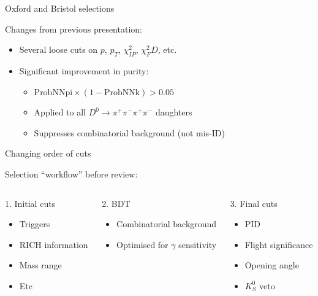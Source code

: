 \documentclass[xcolor={dvipsnames}]{beamer}
\begin{document}
\begin{frame}{Oxford and Bristol selections}
  \begin{center}
    {\Large Changes from previous presentation:}
  \end{center}
  \vspace{0.5cm}
  \begin{itemize}
    \setlength\itemsep{1.8em}
    \item{Several loose cuts on $p$, $p_T$, $\chi^2_{IP}$, $\chi^2_FD$, etc.}
    \item{Significant improvement in purity:}
    \begin{itemize}
      \item{$\text{ProbNNpi}\times(1 - \text{ProbNNk}) > 0.05$}
      \item{Applied to all $D^0\to\pi^+\pi^-\pi^+\pi^-$ daughters}
      \item{Suppresses combinatorial background (not mis-ID)}
    \end{itemize}
  \end{itemize}
\end{frame}

\begin{frame}{Changing order of cuts}
  \begin{center}
    {\Large Selection ``workflow'' before review:}
  \end{center}
  \vspace{0.4cm}
  \begin{columns}
    \begin{column}{0.33\textwidth}
      1. Initial cuts
      \begin{itemize}
        \item{Triggers}
        \item{RICH information}
        \item{Mass range}
        \item{Etc}
      \end{itemize}
    \end{column}
    \begin{column}{0.33\textwidth}
      2. BDT
      \begin{itemize}
        \item{Combinatorial background}
        \item{Optimised for $\gamma$ sensitivity}
      \end{itemize}
    \end{column}
    \begin{column}{0.33\textwidth}
      3. Final cuts
      \begin{itemize}
        \item{PID}
        \item{Flight significance}
        \item{Opening angle}
        \item{$K_S^0$ veto}
      \end{itemize}
    \end{column}
  \end{columns}
\end{frame}
\end{document}
